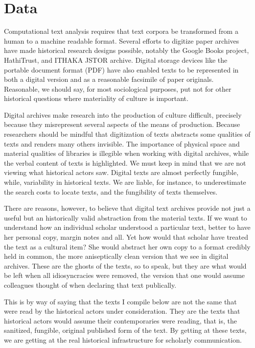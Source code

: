 \documentclass[]{book}
\begin{document}
\chapter{Data}\label{kd-d}

Computational text analysis requires that text corpora be transformed
from a human to a machine readable format. Several efforts to digitize
paper archives have made historical research designs possible, notably
the Google Books project, HathiTrust, and ITHAKA JSTOR archive. Digital
storage devices like the portable document format (PDF) have also
enabled texts to be represented in both a digital version and as a
reasonable facsimile of paper originals. Reasonable, we should say, for
most sociological purposes, put not for other historical questions where
materiality of culture is important. \citep[
:149]{Schreibman2014NonConsumptive}

Digital archives make research into the production of culture difficult,
precisely because they misrepresent several aspects of the means of
production. Because researchers should be mindful that digitization of
texts abstracts some qualities of texts and renders many others
invisible. The importance of physical space and material qualities of
libraries is illegible when working with digital archives, while the
verbal content of texts is highlighted. We must keep in mind that we are
not viewing what historical actors saw. Digital texts are almost
perfectly fungible, while, variability in historical texts. We are
liable, for instance, to underestimate the search costs to locate texts,
and the fungibility of texts themselves.

There are reasons, however, to believe that digital text archives
provide not just a useful but an historically valid abstraction from the
material texts. If we want to understand how an individual scholar
understood a particular text, better to have her personal copy, margin
notes and all. Yet how would that scholar have treated the text as a
cultural item? She would abstract her own copy to a format credibly held
in common, the more aniseptically clean version that we see in digital
archives. These are the ghosts of the texts, so to speak, but they are
what would be left when all idiosyncracies were removed, the version
that one would assume colleagues thought of when declaring that text
publically.

This is by way of saying that the texts I compile below are not the same
that were read by the historical actors under consideration. They are
the texts that historical actors would assume their contemporaries were
reading, that is, the sanitized, fungible, original published form of
the text. By getting at these texts, we are getting at the real
historical infrastructure for scholarly communication.
\end{document}
